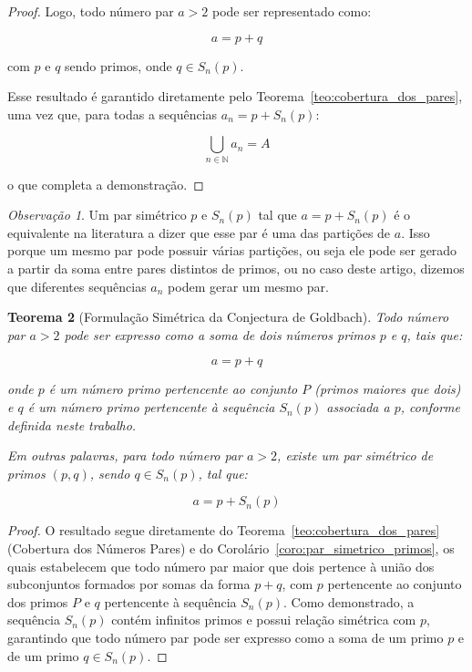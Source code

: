 \documentclass[a4paper,11pt]{article}
\newtheorem{theorem}{Teorema}[section]
\theoremstyle{definition}
\theoremstyle{remark}
\newtheorem{remark}[theorem]{Observação}
\begin{document}
\begin{otherlanguage}{brazil}
\begin{proof}
		Logo, todo número par \(a > 2\) pode ser representado como:
		
		\[
		a = p + q
		\]
		
		com \(p\) e \(q\) sendo primos, onde \(q \in S_n(p)\).
		
		Esse resultado é garantido diretamente pelo Teorema~\ref{teo:cobertura_dos_pares}, uma vez que, para todas a sequências \(a_n = p + S_n(p) \):
		
		\[
		\bigcup_{n \in \mathbb{N}} a_n = A
		\]
		
		o que completa a demonstração. 
	\end{proof}
	
	\begin{remark}
		Um par simétrico \(p\) e \(S_n(p)\) tal que \( a = p + S_n(p)\) é o equivalente na literatura a dizer que esse par é uma das partições de \(a\). Isso porque um mesmo par pode possuir várias partições, ou seja ele pode ser gerado a partir da soma entre pares distintos de primos, ou no caso deste artigo, dizemos que diferentes sequências \(a_n\) podem gerar um mesmo par.
	\end{remark}
	
	
	\begin{theorem}[Formulação Simétrica da Conjectura de Goldbach]\label{teo:goldbach_por_simetria_de_primos}
		Todo número par \(a > 2\) pode ser expresso como a soma de dois números primos \(p\) e \(q\), tais que:
		
		\[
		a = p + q
		\]
		
		onde \(p\) é um número primo pertencente ao conjunto \(P\) (primos maiores que dois) e \(q\) é um número primo pertencente à sequência \(S_n(p)\) associada a \(p\), conforme definida neste trabalho.
		
		Em outras palavras, para todo número par \(a > 2\), existe um par simétrico de primos \((p, q)\), sendo \(q \in S_n(p)\), tal que:
		
		\[
		a = p + S_n(p)
		\]
	\end{theorem}
	\begin{proof}
	O resultado segue diretamente do Teorema~\ref{teo:cobertura_dos_pares} (Cobertura dos Números Pares) e do Corolário~\ref{coro:par_simetrico_primos}, os quais estabelecem que todo número par maior que dois pertence à união dos subconjuntos formados por somas da forma \(p + q\), com \(p\) pertencente ao conjunto dos primos \(P\) e \(q\) pertencente à sequência \(S_n(p)\). Como demonstrado, a sequência \(S_n(p)\) contém infinitos primos e possui relação simétrica com \(p\), garantindo que todo número par pode ser expresso como a soma de um primo \(p\) e de um primo \(q \in S_n(p)\).
	

\end{proof}
\end{otherlanguage}
\end{document}

